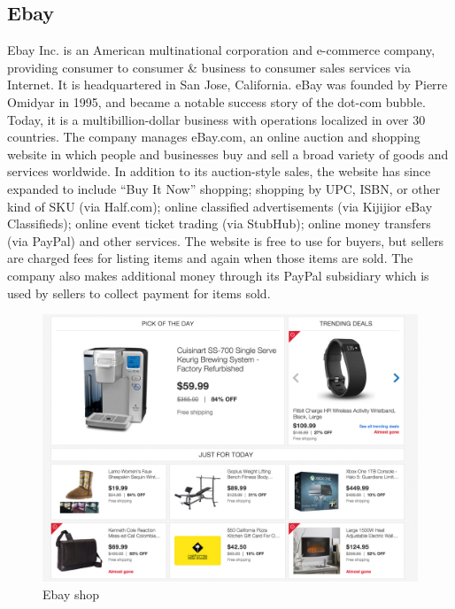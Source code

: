 \subsection{Ebay}
Ebay Inc. is an American multinational corporation and e-commerce company, providing consumer to consumer \& business to consumer sales services via Internet. It is headquartered in San Jose, California. eBay was founded by Pierre Omidyar in 1995, and became a notable success story of the dot-com bubble. Today, it is a multibillion-dollar business with operations localized in over 30 countries.
\newline
The company manages eBay.com, an online auction and shopping website in which people and businesses buy and sell a broad variety of goods and services worldwide. In addition to its auction-style sales, the website has since expanded to include “Buy It Now” shopping; shopping by UPC, ISBN, or other kind of SKU (via Half.com); online classified advertisements (via Kijijior eBay Classifieds); online event ticket trading (via StubHub); online money transfers (via PayPal) and other services.
\newline
The website is free to use for buyers, but sellers are charged fees for listing items and again when those items are sold. The company also makes additional money through its PayPal subsidiary which is used by sellers to collect payment for items sold.
\begin{figure}[htb]
 \centering
 \includegraphics[width=1.0\linewidth]{images/chapter1/ex-ebay.png}\hfill
 \caption[Ebay shop]{Ebay shop}
 \label{fig:e_commerce_ebay_shop}
\end{figure}
